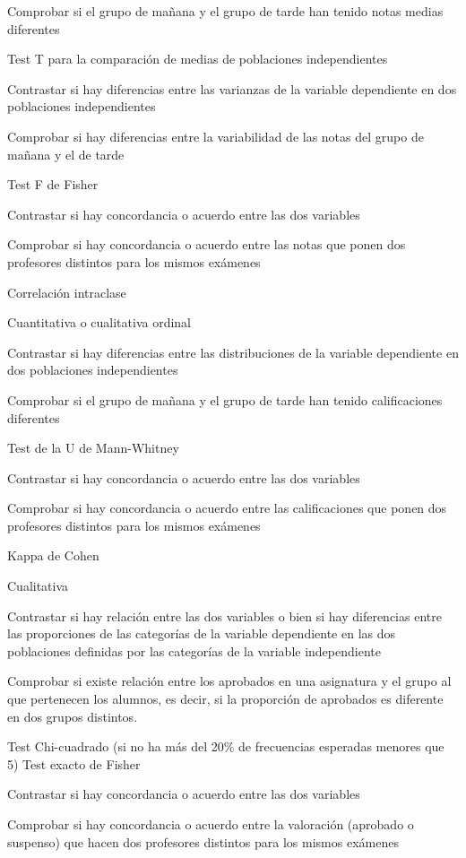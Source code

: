 \documentclass[
  a4paper,
]{scrreport}
\theoremstyle{definition}
\theoremstyle{definition}
\theoremstyle{remark}
\begin{document}
Comprobar si el grupo de mañana y el grupo de tarde han tenido notas
medias diferentes

Test T para la comparación de medias de poblaciones independientes

Contrastar si hay diferencias entre las varianzas de la variable
dependiente en dos poblaciones independientes

Comprobar si hay diferencias entre la variabilidad de las notas del
grupo de mañana y el de tarde

Test F de Fisher

Contrastar si hay concordancia o acuerdo entre las dos variables

Comprobar si hay concordancia o acuerdo entre las notas que ponen dos
profesores distintos para los mismos exámenes

Correlación intraclase

Cuantitativa o cualitativa ordinal

Contrastar si hay diferencias entre las distribuciones de la variable
dependiente en dos poblaciones independientes

Comprobar si el grupo de mañana y el grupo de tarde han tenido
calificaciones diferentes

Test de la U de Mann-Whitney

Contrastar si hay concordancia o acuerdo entre las dos variables

Comprobar si hay concordancia o acuerdo entre las calificaciones que
ponen dos profesores distintos para los mismos exámenes

Kappa de Cohen

Cualitativa

Contrastar si hay relación entre las dos variables o bien si hay
diferencias entre las proporciones de las categorías de la variable
dependiente en las dos poblaciones definidas por las categorías de la
variable independiente

Comprobar si existe relación entre los aprobados en una asignatura y el
grupo al que pertenecen los alumnos, es decir, si la proporción de
aprobados es diferente en dos grupos distintos.

Test Chi-cuadrado (si no ha más del 20\% de frecuencias esperadas
menores que 5) Test exacto de Fisher

Contrastar si hay concordancia o acuerdo entre las dos variables

Comprobar si hay concordancia o acuerdo entre la valoración (aprobado o
suspenso) que hacen dos profesores distintos para los mismos exámenes
\end{document}
